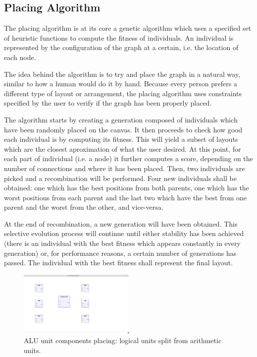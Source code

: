 \label{chap:impl}

\subsection{Placing Algorithm}
 
The placing algorithm is at its core a genetic algorithm \cite{chambers2010practical} which uses
a specified set of heuristic functions to compute the fitness of individuals.
An individual is represented by the configuration of the graph at a certain, i.e.
the location of each node.

The idea behind the algorithm is to try and place the graph in a natural way, similar
to how a human would do it by hand. Because every person prefers a different type of 
layout or arrangement, the placing algorithm uses constraints specified by the user
to verify if the graph has been properly placed.

The algorithm starts by creating a generation composed of individuals which have 
been randomly placed on the canvas. It then proceeds to check how good each 
individual is by computing its fitness. This will yield a subset of layouts which
are the closest aproximation of what the user desired. At this point, for each 
part of individual (i.e. a node) it further computes a score, depending on the
number of connections and where it has been placed. Then, two individuals are 
picked and a recombination will be performed. Four new individuals shall be obtained:
one which has the best positions from both parents, one which has the worst positions
from each parent and the last two which have the best from one parent and the 
worst from the other, and vice-versa.

At the end of recombination, a new generation will have been obtained. This selective 
evolution process \cite{goldberg2006genetic} will continue until either stability has been achieved (there is an
individual with the best fitness which appears constantly in every generation) or, for 
performance reasons, a certain number of generations has passed. The individual with 
the best fitness shall represent the final layout.

\begin{figure}[ht] \centering
\includegraphics[width=0.5\textwidth]{src/placingLogic.png}
\caption{ALU unit components placing: logical units split from arithmetic units.} \end{figure}

